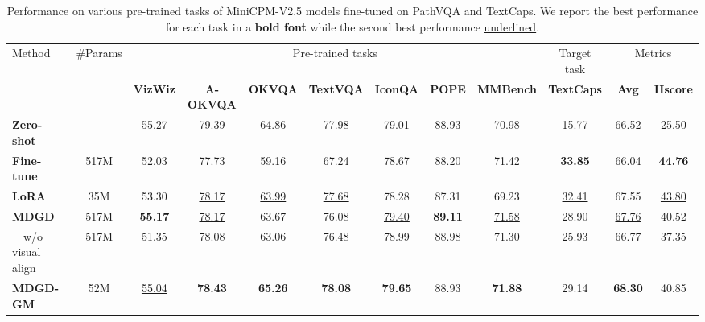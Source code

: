 \begin{table*}[ht]
\begin{tabular}{lccccccccccc}
    \multirow{2}{*}{Method} & \multirow{2}{*}{\#Params} & \multicolumn{7}{c}{Pre-trained tasks} & \multicolumn{1}{c}{Target task} & \multicolumn{2}{c}{Metrics} \\
    \cmidrule(lr){3-9} \cmidrule(lr){10-10} \cmidrule(lr){11-12}
    &                        & \textbf{VizWiz} & \textbf{A-OKVQA} & \textbf{OKVQA} & \textbf{TextVQA} & \textbf{IconQA} & \textbf{POPE} & \textbf{MMBench} & \textbf{TextCaps} & \textbf{Avg} & \textbf{Hscore} \\
    \midrule
    \textbf{Zero-shot}        & -     & 55.27  & 79.39 & 64.86 & 77.98 & 79.01 & 88.93 & 70.98 & 15.77 & 66.52 & 25.50  \\
    \midrule
    \textbf{Fine-tune}        & 517M  & 52.03  & 77.73 & 59.16 & 67.24 & 78.67 & 88.20 & 71.42 & \textbf{33.85} & 66.04 & \textbf{44.76} \\
    \textbf{LoRA}             & 35M  & 53.30  & \underline{78.17}          & \underline{63.99} & \underline{77.68} & 78.28 & 87.31 & 69.23 & \underline{32.41} & 67.55 & \underline{43.80} \\
    \midrule
    \textbf{MDGD}             & 517M  & \textbf{55.17}  & \underline{78.17} & 63.67          & 76.08 & \underline{79.40} & \textbf{89.11} & \underline{71.58} & 28.90 & \underline{67.76} & 40.52 \\
    ~~w/o visual align & 517M  & 51.35           & 78.08            & 63.06          & 76.48 & 78.99                & \underline{88.98} & 71.30 & 25.93 & 66.77 & 37.35 \\
    \textbf{MDGD-GM}  & 52M   & \underline{55.04}  & \textbf{78.43} & \textbf{65.26} & \textbf{78.08} & \textbf{79.65} & 88.93           & \textbf{71.88} & 29.14 & \textbf{68.30} & 40.85 \\
    \bottomrule
  \end{tabular}
  \caption{
  Performance on various pre-trained tasks of MiniCPM-V2.5 models fine-tuned on PathVQA and TextCaps. 
  We report the best performance for each task in a \textbf{bold font} while the second best performance \underline{underlined}.
  }
  \label{tab:minicpm}
  \vspace{-.8cm}
\end{table*}
